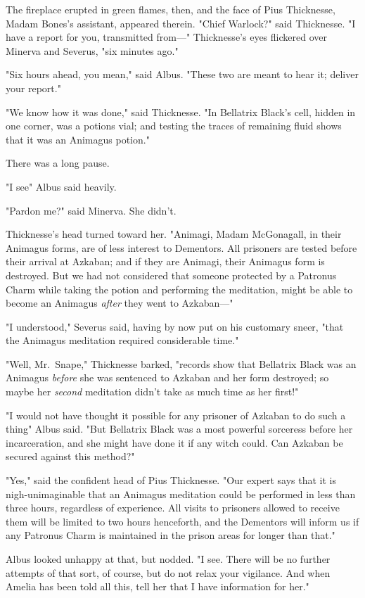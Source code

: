 The fireplace erupted in green flames, then, and the face of Pius Thicknesse,
Madam Bones's assistant, appeared therein. "Chief Warlock?" said Thicknesse. "I
have a report for you, transmitted from---" Thicknesse's eyes flickered over
Minerva and Severus, "six minutes ago."

"Six hours ahead, you mean," said Albus. "These two are meant to hear it;
deliver your report."

"We know how it was done," said Thicknesse. "In Bellatrix Black's cell, hidden
in one corner, was a potions vial; and testing the traces of remaining fluid
shows that it was an Animagus potion."

There was a long pause.

"I see{\el}" Albus said heavily.

"Pardon me?" said Minerva. She didn't.

Thicknesse's head turned toward her. "Animagi, Madam McGonagall, in their
Animagus forms, are of less interest to Dementors. All prisoners are tested
before their arrival at Azkaban; and if they are Animagi, their Animagus form
is destroyed. But we had not considered that someone protected by a Patronus
Charm while taking the potion and performing the meditation, might be able to
become an Animagus \emph{after} they went to Azkaban---"

"I understood," Severus said, having by now put on his customary sneer, "that
the Animagus meditation required considerable time."

"Well, Mr.~Snape," Thicknesse barked, "records show that Bellatrix Black was an
Animagus \emph{before} she was sentenced to Azkaban and her form destroyed; so
maybe her \emph{second} meditation didn't take as much time as her first!"

"I would not have thought it possible for any prisoner of Azkaban to do such a
thing{\el}" Albus said. "But Bellatrix Black was a most powerful sorceress
before her incarceration, and she might have done it if any witch could. Can
Azkaban be secured against this method?"

"Yes," said the confident head of Pius Thicknesse. "Our expert says that it is
nigh-unimaginable that an Animagus meditation could be performed in less than
three hours, regardless of experience. All visits to prisoners allowed to
receive them will be limited to two hours henceforth, and the Dementors will
inform us if any Patronus Charm is maintained in the prison areas for longer
than that."

Albus looked unhappy at that, but nodded. "I see. There will be no further
attempts of that sort, of course, but do not relax your vigilance. And when
Amelia has been told all this, tell her that I have information for her."

